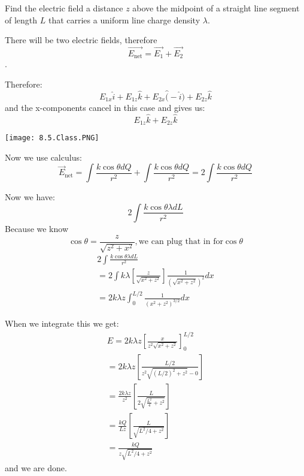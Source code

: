 \documentclass[../em.tex]{subfiles}
\begin{document}
\begin{example}
    Find the electric field a distance $z$ above the midpoint of a straight line segment of 
    length $L$ that carries a uniform line charge density $\lambda$.
    
    There will be two electric fields, therefore 
    \[\vec{E_{\text{net}}}=\vec{E_1}+\vec{E_2}\].
    
    Therefore:
    \[E_{1x}\hat{i}+E_{1z}\hat{k}+E_{2x}\hat(-\hat{i})+E_{2z}\hat{k}\] 
    and the x-components cancel in this case and gives us:
    \[E_{1z}\hat{k}+E_{2z}\hat{k}\]
    
    \begin{center}
        \texttt{[image: 8.5.Class.PNG]}
    \end{center}

    Now we use calculus:
    \[\vec{E}_{\text{net}}=\int{\frac{k\cos \theta dQ}{r^2}}+\int{\frac{k\cos\theta dQ}{r^2}}=2\int{\frac{k\cos\theta dQ}{r^2}}\]
    
    Now we have: 
    \[2\int{\frac{k\cos\theta\lambda dL}{r^2}}\]
    Because we know
    \[\cos\theta = \frac{z}{\sqrt{z^2+x^2}}, \text{we can plug that in for} \cos\theta\]
    \begin{align*}
        2\int{\frac{k\cos\theta\lambda dL}{r^2}}
        \\
        =2\int{k\lambda\left[\frac{z}{\sqrt{x^2+z^2}}\right]\frac{1}{(\sqrt{x^2+z^2})^2}dx}
        \\=2k\lambda z\int_0^{L/2}{\frac{1}{(x^2+z^2)^{3/2}}dx}
    \end{align*}
    
    When we integrate this we get:
    \begin{align*}
    E=2k\lambda z\left[\frac{x}{z^2\sqrt{x^2+z^2}}\right]^{L/2}_0
    \\
    =2k\lambda z\left[\frac{L/2}{z^2\sqrt{(L/2)^2+z^2}-0}\right]
    \\
    =\frac{2k\lambda z}{z^2}\left[\frac{L}{2\sqrt{\frac{L^2}{4}+z^2}}\right]
    \\
    =\frac{kQ}{Lz}\left[\frac{L}{\sqrt{L^2/4+z^2}}\right]
    \\
    =\frac{kQ}{z\sqrt{L^2/4+z^2}}
    \end{align*}
    and we are done.
\end{example}
\end{document}
